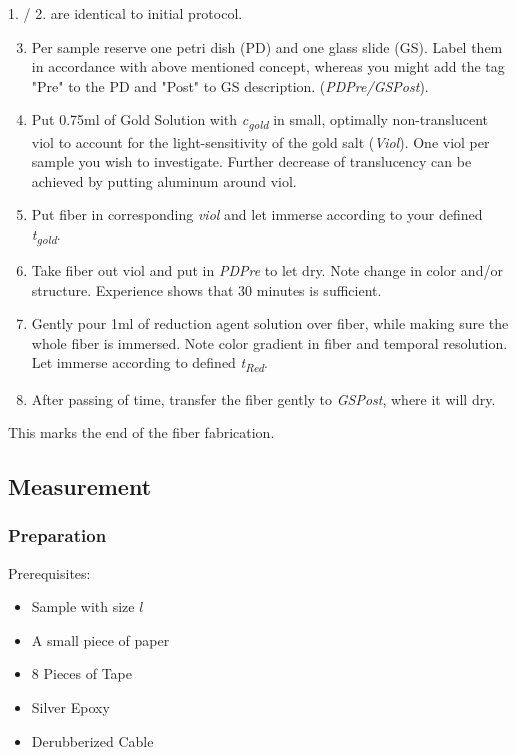 1. / 2. are identical to initial protocol.

\begin{enumerate}
\setcounter{enumi}{2}
    
    \item Per sample reserve one petri dish (PD) and one glass slide (GS). Label them in accordance with above mentioned concept, whereas you might add the tag "Pre" to the PD and "Post" to GS description. (\textit{PDPre/GSPost}).
    
    \item Put 0.75ml of Gold Solution with \textit{c\textsubscript{gold}} in small, optimally non-translucent viol to account for the light-sensitivity of the gold salt (\textit{Viol}). One viol per sample you wish to investigate. Further decrease of translucency can be achieved by putting aluminum around viol.
    
    \item Put fiber in corresponding \textit{viol} and let immerse according to your defined \textit{t\textsubscript{gold}}.
    \item Take fiber out viol and put in \textit{PDPre} to let dry. Note change in color and/or structure. Experience shows that 30 minutes is sufficient.
    
    \item Gently pour 1ml of reduction agent solution over fiber, while making sure the whole fiber is immersed. Note color gradient in fiber and temporal resolution. Let immerse according to defined \textit{t\textsubscript{Red}}.
    
    \item After passing of time, transfer the fiber gently to \textit{GSPost}, where it will dry.
    \end{enumerate}
    
    \begin{center}
        This marks the end of the fiber fabrication.
    \end{center}

\subsection{Measurement}

\subsubsection{Preparation}
Prerequisites:
\begin{multicols}{2}
\begin{itemize}
    \item Sample with size $l$
    \item A small piece of paper
    \item 8 Pieces of Tape
    \item Silver Epoxy
    \item Derubberized Cable
\end{itemize}
\end{multicols}

